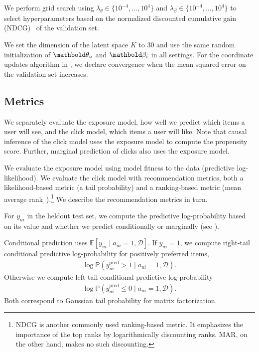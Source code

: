  We perform grid search using
$\lambda_\theta \in \{10^{-4}, \dots, 10^4\}$ and
$\lambda_\beta \in \{10^{-4}, \dots, 10^4\}$ to select
hyperparameters based on the normalized discounted cumulative gain
(NDCG)~\citep{jarvelin2002cumulated} of the validation set.

We set the dimension of the latent space $K$ to 30 and use the same random initialization of $\mb\theta_u$ and
$\mb\beta_i$ in all settings. For the coordinate updates algorithm in , we declare convergence when the mean
squared error on the validation set increases.

\subsection{Metrics}\label{sec:metrics}

We separately evaluate the exposure model, how well we predict which
items a user will see, and the click model, which items a user will
like.  Note that causal inference of the click model uses the exposure
model to compute the propensity score.  Further, marginal prediction
of clicks also uses the exposure model.

We evaluate the exposure model using model fitness to the data
(predictive log-likelihood). We evaluate the click model with
recommendation metrics, both a likelihood-based metric (a tail
probability) and a ranking-based metric (mean average
rank~\citep{charlin2015dynamic}).\footnote{NDCG \citep{jarvelin2002cumulated} is another commonly used
  ranking-based metric. It emphasizes the importance of the top ranks
  by logarithmically discounting ranks. MAR, on the other hand, makes
  no such discounting.} We describe the recommendation metrics in turn.



 For $y_{ui}$ in the
heldout test set, we compute the predictive log-probability based on
its value and whether we predict conditionally or marginally (see ).

Conditional prediction uses
$\mathbb{E}[y_{ui} \mid a_{ui} = 1, \mathcal{D}]$. If $y_{ui} = 1$, we
compute right-tail conditional predictive log-probability for
positively preferred items,
\begin{align*}
  \log \mathbb{P}(y^{\text{pred}}_{ui} > 1 \mid a_{ui} = 1,
  \mathcal{D}).
\end{align*}
Otherwise we compute left-tail conditional predictive
log-probability
\begin{align*}
  \log \mathbb{P}(y^{\text{pred}}_{ui} \leq 0 \mid a_{ui} = 1,
  \mathcal{D}).
\end{align*}
Both correspond to Gaussian tail probability for matrix factorization.

